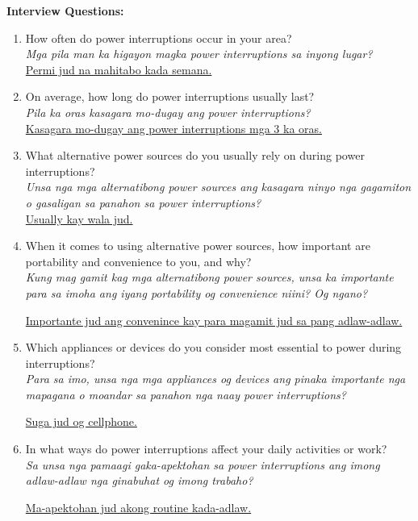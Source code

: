 \begin{mdframed}
\noindent \textbf{Interview Questions:}
\hrulespace 

\begin{enumerate}[label=\textbf{\arabic*.}, itemsep=1em]
\item How often do power interruptions occur in your area?
\\ \textit{Mga pila man ka higayon magka power interruptions sa inyong lugar?}
\\ \uline{Permi jud na mahitabo kada semana.}

\item On average, how long do power interruptions usually last?
\\ \textit{Pila ka oras kasagara mo-dugay ang power interruptions?}
\\ \uline{Kasagara mo-dugay ang power interruptions mga 3 ka oras.}

\item What alternative power sources do you usually rely on during power interruptions? 
\\ \textit{Unsa nga mga alternatibong power sources ang kasagara ninyo nga gagamiton o gasaligan sa panahon sa power interruptions?}
\\ \uline{Usually kay wala jud.}

\item When it comes to using alternative power sources, how important are portability and convenience to you, and why?
\\ \textit{Kung mag gamit kag mga alternatibong power sources, unsa ka importante para sa imoha ang iyang portability og convenience niini? Og ngano?}
\\ \parbox{\linewidth}{\uline{Importante jud ang convenince kay para magamit jud sa pang adlaw-adlaw.}}

\item Which appliances or devices do you consider most essential to power during interruptions?
\\ \textit{Para sa imo, unsa nga mga appliances og devices ang pinaka importante nga mapagana o moandar sa panahon nga naay power interruptions?}
\\ \parbox{\linewidth}{\uline{Suga jud og cellphone.}}

\item In what ways do power interruptions affect your daily activities or work?  
\\ \textit{Sa unsa nga pamaagi gaka-apektohan sa power interruptions ang imong adlaw-adlaw nga ginabuhat og imong trabaho?}
\\ \parbox{\linewidth}{\uline{Ma-apektohan jud akong routine kada-adlaw.}}


\end{enumerate}
\end{mdframed}
